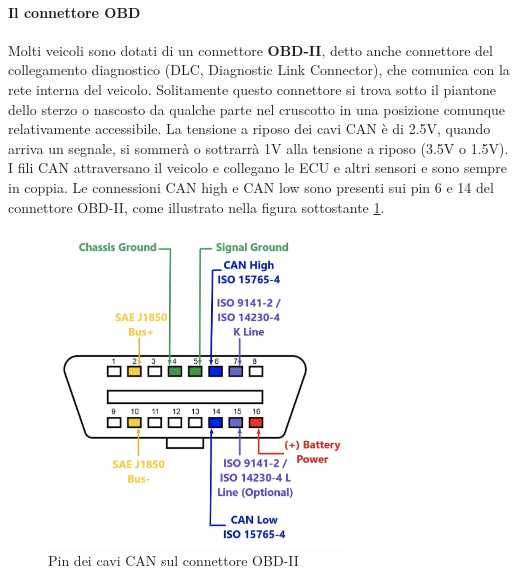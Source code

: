 \documentclass[12pt, a4paper, italian]{report}
\numberwithin{figure}{chapter}
\numberwithin{table}{chapter}
\begin{document}
\paragraph{Il connettore OBD} Molti veicoli sono dotati di un connettore \textbf{OBD-II}, detto anche connettore del collegamento diagnostico (DLC, Diagnostic Link Connector), che comunica con la rete interna del veicolo. Solitamente questo connettore si trova sotto il piantone dello sterzo o nascosto da qualche parte nel cruscotto in una posizione comunque relativamente accessibile.
La tensione a riposo dei cavi CAN è di 2.5V, quando arriva un segnale, si sommerà o sottrarrà 1V alla tensione a riposo  (3.5V o 1.5V). I fili CAN attraversano il veicolo e collegano le ECU e altri sensori e sono sempre in coppia. Le connessioni CAN high e CAN low sono presenti sui pin 6 e 14 del connettore OBD-II, come illustrato nella figura sottostante \ref{fig:Connettore OBD}. \cite{manualeHacker}


\begin{figure}[h]
  \centering
  \includegraphics[width=8cm]{Connettore_OBD-II.png}
  \caption{Pin dei cavi CAN sul connettore OBD-II}
  \label{fig:Connettore OBD}
\end{figure}
\end{document}
